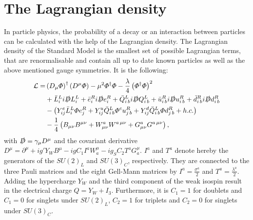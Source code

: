 \section{The Lagrangian density}
In particle physics, the probability of a decay or an interaction between particles can be calculated with the help of the Lagrangian density.
The Lagrangian density of the Standard Model is the smallest set of possible Lagrangian terms, that are renormalisable and contain all up to date known particles as well as the above mentioned gauge symmetries.
It is the following:
\begin{equation}
\begin{split}
 \mathcal{L} =& \left( D_{\mu} \Phi \right)^{\dagger} \left( D^{\mu} \Phi \right) -\mu^2\Phi^{\dagger} \Phi -\frac{\lambda}{4} \left( \Phi^{\dagger} \Phi \right)^2\\
 & + \bar{L}^L_i i \slashed{D} L^{L}_i + \bar{e}^{R}_i i \slashed{D} e^{R}_i +  \bar{Q}^L_{i\,b} i \slashed{D} Q^L_{i\,b} + \bar{u}^{R}_{i\,b} i \slashed{D} u^{R}_{i\,b} +
\bar{d}^{R}_{i\,b} i \slashed{D} d^{R}_{i\,b}\\
& - \left( Y^e_{ij} \bar{L}^L_i \Phi e^R_j + Y^u_{ij} \bar{Q}^L_{i\,b} \Phi^c u^R_{j\,b} + Y^d_{ij} \bar{Q}^L_{i\,b} \Phi d^R_{j\,b} + h.c. \right)\\
& - \frac{1}{4} \left( B_{\mu\nu}  B^{\mu\nu} +  W^a_{\mu\nu} W^{a\,\mu\nu} +  G^a_{\mu\nu} G^{a\,\mu\nu}    \right),
\end{split}
\label{eq:LagrangianDensity}
\end{equation}
with $\slashed{D} = \gamma_{\mu} D^{\mu}$ and the covariant derivative $D^{\mu}=\partial^{\mu} + i g' Y_W B^{\mu} - i g C_1  I^a W_a^{\mu}  - i g_S C_2 T^a G_a^{\mu}$.
$I^a$ and $T^a$ denote hereby the generators of the $SU(2)_L$ and $SU(3)_C$, respectively.
They are connected to the three Pauli matrices and the eight Gell-Mann matrices by $I^a = \frac{\sigma^a}{2}$ and $T^a = \frac{\lambda^a}{2}$.
Adding the hypercharge $Y_W$ and the third component of the weak isospin result in the electrical charge $Q=Y_W + I_3$.
Furthermore, it is $C_1=1 $ for doublets and $C_1=0$ for singlets under $SU(2)_L$, $C_2=1$ for triplets and $C_2=0 $ for singlets under $SU(3)_C$.  

